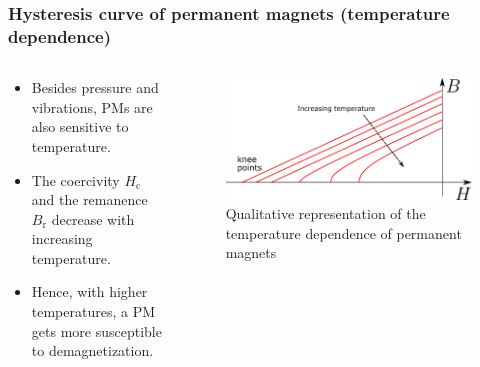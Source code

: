 \begin{frame}
	\frametitle{Hysteresis curve of permanent magnets (temperature dependence)}
	\begin{columns}
		\begin{column}{0.4\textwidth}
            \begin{itemize}
                \item Besides pressure and vibrations, PMs are also sensitive to temperature.
                \item The coercivity $H_\mathrm{c}$ and the remanence $B_\mathrm{r}$ decrease with increasing temperature.
                \item Hence, with higher temperatures, a PM gets more susceptible to demagnetization.
            \end{itemize}
		\end{column}
        \hspace{0.25cm}
		\begin{column}{0.4\textwidth}
			\begin{figure}
				\centering
				\includegraphics[height=0.4\textheight]{fig/lec02/Hyteresis_curve_PM_temperature.pdf}
				\caption{Qualitative representation of the temperature dependence of permanent magnets}
			\end{figure}
		\end{column}
		\end{columns}
\end{frame}

